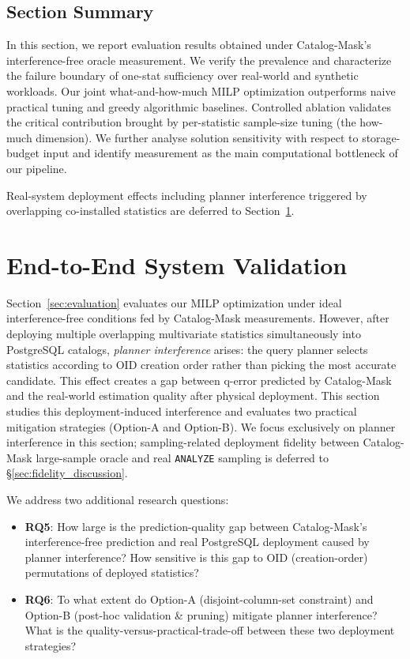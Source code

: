 \documentclass[sigconf, nonacm]{acmart}
\begin{document}
\subsection{Section Summary}
In this section, we report evaluation results obtained under Catalog-Mask's interference-free oracle measurement.
We verify the prevalence and characterize the failure boundary of one-stat sufficiency over real-world and synthetic workloads.
Our joint what-and-how-much MILP optimization outperforms naive practical tuning and greedy algorithmic baselines.
Controlled ablation validates the critical contribution brought by per-statistic sample-size tuning (the how-much dimension).
We further analyse solution sensitivity with respect to storage-budget input and identify measurement as the main computational bottleneck of our pipeline.

Real-system deployment effects including planner interference triggered by overlapping co-installed statistics are deferred to Section~\ref{sec:end2end}.

\section{End-to-End System Validation}
\label{sec:end2end}
\label{sec:e2e}

Section~\ref{sec:evaluation} evaluates our MILP optimization under ideal interference-free conditions fed by Catalog-Mask measurements.
However, after deploying multiple overlapping multivariate statistics simultaneously into PostgreSQL catalogs, \emph{planner interference} arises: the query planner selects statistics according to OID creation order rather than picking the most accurate candidate.
This effect creates a gap between q-error predicted by Catalog-Mask and the real-world estimation quality after physical deployment.
This section studies this deployment-induced interference and evaluates two practical mitigation strategies (Option-A and Option-B).
We focus exclusively on planner interference in this section; sampling-related deployment fidelity between Catalog-Mask large-sample oracle and real \texttt{ANALYZE} sampling is deferred to \S\ref{sec:fidelity_discussion}.

We address two additional research questions:
\begin{itemize}
    \item \textbf{RQ5}: How large is the prediction-quality gap between Catalog-Mask's interference-free prediction and real PostgreSQL deployment caused by planner interference? How sensitive is this gap to OID (creation-order) permutations of deployed statistics?
    \item \textbf{RQ6}: To what extent do Option-A (disjoint-column-set constraint) and Option-B (post-hoc validation \& pruning) mitigate planner interference? What is the quality-versus-practical-trade-off between these two deployment strategies?
\end{itemize}
\end{document}
